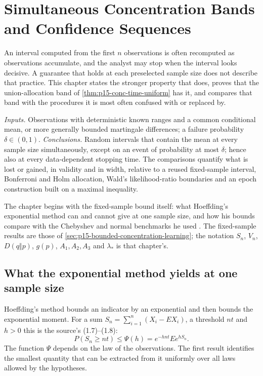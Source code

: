 \chapter{Simultaneous Concentration Bands and Confidence Sequences}
\label{sec:p15-w02b-p15-063}

An interval computed from the first \(n\) observations is often recomputed
as observations accumulate, and the analyst may stop when the interval
looks decisive. A guarantee that holds at each preselected sample size
does not describe that practice. This chapter states the stronger
property that does, proves that the union-allocation band of
\cref{thm:p15-conc-time-uniform} has it, and compares that band with the
procedures it is most often confused with or replaced by.

\emph{Inputs.} Observations with deterministic known ranges and a common
conditional mean, or more generally bounded martingale differences; a
failure probability \(\delta\in(0,1)\). \emph{Conclusions.} Random
intervals that contain the mean at every sample size simultaneously,
except on an event of probability at most \(\delta\); hence also at every
data-dependent stopping time. The comparisons quantify what is lost or
gained, in validity and in width, relative to a reused fixed-sample
interval, Bonferroni and Holm allocation, Wald's likelihood-ratio
boundaries and an epoch construction built on a maximal inequality.

The chapter begins with the fixed-sample bound itself: what Hoeffding's
exponential method can and cannot give at one sample size, and how his
bounds compare with the Chebyshev and normal benchmarks he used
\cite[pp.~13--15 and~17]{Hoeffding1963BoundedSums}. The fixed-sample
results are those of \cref{sec:p15-bounded-concentration-learning}; the
notation \(S_n\), \(V_n\), \(D(q\Vert p)\), \(g(p)\), \(A_1,A_2,A_3\)
and \(\lambda_*\) is that chapter's.

\section{What the exponential method yields at one sample size}
\label{sec:p15-w02b-p15-063-fixed-sample}

Hoeffding's method bounds an indicator by an exponential and then bounds
the exponential moment. For a sum \(S_n=\sum_{i=1}^n(X_i-EX_i)\), a
threshold \(nt\) and \(h>0\) this is the source's (1.7)--(1.8):
\[
 P(S_n\geq nt)\leq\Psi(h)=e^{-hnt}Ee^{hS_n}.
\]
The function \(\Psi\) depends on the law of the observations. The first
result identifies the smallest quantity that can be extracted from it
uniformly over all laws allowed by the hypotheses.

